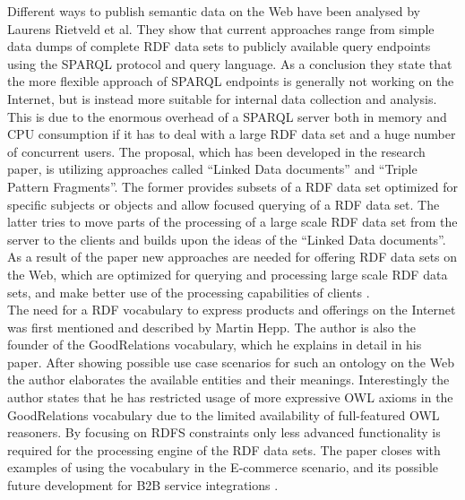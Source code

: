 Different ways to publish semantic data on the Web have been analysed by Laurens Rietveld et al. They show that current approaches range from simple data dumps of complete \gls{RDF} data sets to publicly available query endpoints using the \gls{SPARQL} protocol and query language. As a conclusion they state that the more flexible approach of \gls{SPARQL} endpoints is generally not working on the Internet, but is instead more suitable for internal data collection and analysis. This is due to the enormous overhead of a \gls{SPARQL} server both in memory and CPU consumption if it has to deal with a large \gls{RDF} data set and a huge number of concurrent users. The proposal, which has been developed in the research paper, is utilizing approaches called ``Linked Data documents'' and ``Triple Pattern Fragments''. The former provides subsets of a \gls{RDF} data set optimized for specific subjects or objects and allow focused querying of a \gls{RDF} data set. The latter tries to move parts of the processing of a large scale \gls{RDF} data set from the server to the clients and builds upon the ideas of the ``Linked Data documents''. As a result of the paper new approaches are needed for offering \gls{RDF} data sets on the Web, which are optimized for querying and processing large scale \gls{RDF} data sets, and make better use of the processing capabilities of clients \citep{rietveld2015linked}. \\

The need for a \gls{RDF} vocabulary to express products and offerings on the Internet was first mentioned and described by Martin Hepp. The author is also the founder of the GoodRelations vocabulary, which he explains in detail in his paper. After showing possible use case scenarios for such an ontology on the Web the author elaborates the available entities and their meanings. Interestingly the author states that he has restricted usage of more expressive \gls{OWL} axioms in the GoodRelations vocabulary due to the limited availability of full-featured \gls{OWL} reasoners. By focusing on \gls{RDFS} constraints only less advanced functionality is required for the processing engine of the \gls{RDF} data sets. The paper closes with examples of using the vocabulary in the \gls{E-commerce} scenario, and its possible future development for \gls{B2B} service integrations \citep{hepp2008goodrelations}. \\

